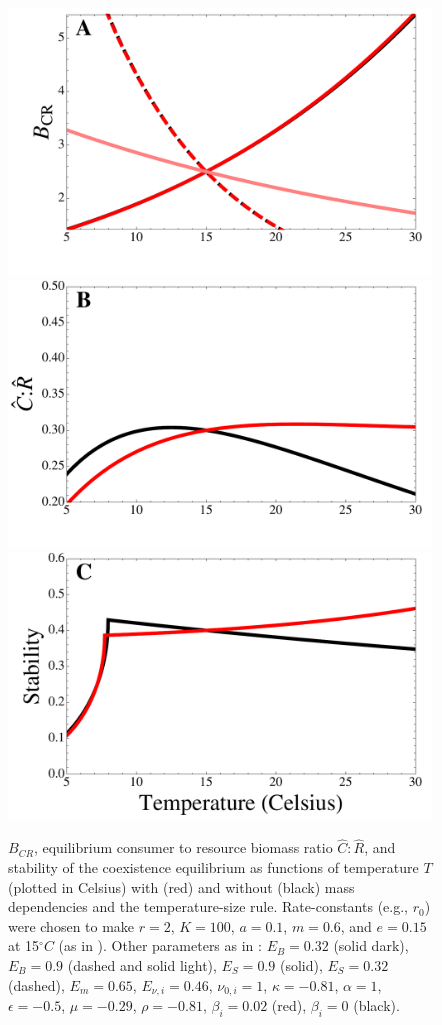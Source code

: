 \documentclass[11pt]{article}
\begin{document}
\begin{figure}[!ht]
\centering
\includegraphics[width=0.5\linewidth]{BCRAllTempMassDep}
\includegraphics[width=0.5\linewidth]{CtoRAllTempMassDep}
\includegraphics[width=0.5\linewidth]{StabilityAllTempMassDep}
\caption{
$B_{CR}$, equilibrium consumer to resource biomass ratio $\hat{C}:\hat{R}$, and stability of the coexistence equilibrium as functions of temperature $T$ (plotted in Celsius) with (red) and without (black) mass dependencies and the temperature-size rule.
Rate-constants (e.g., $r_0$) were chosen to make $r = 2$, $K = 100$, $a = 0.1$, $m = 0.6$, and $e = 0.15$ at 15$^\circ C$ (as in \cite{Gilbert2014}).
Other parameters as in \cite{Gilbert2014,DeLong2015}: $E_B = 0.32$ (solid dark), $E_B = 0.9$ (dashed and solid light), $E_S = 0.9$ (solid), $E_S = 0.32$ (dashed), $E_m = 0.65$, $E_{\nu,i} = 0.46$, $\nu_{0,i} = 1$, $\kappa = -0.81$, $\alpha = 1$, $\epsilon = -0.5$, $\mu = -0.29$, $\rho = -0.81$, $\beta_i = 0.02$ (red), $\beta_i = 0$ (black).  
}
\label{AllTempMassDep}
\end{figure}
\end{document}
